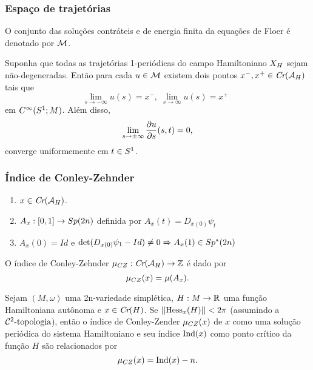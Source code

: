 \documentclass{beamer}
\begin{document}
\begin{footnotesize}
	\begin{frame}
		\frametitle{Espaço de trajetórias}
		O conjunto das soluções contráteis e de energia finita da equações de Floer é denotado por $\mathcal{M}$.
		
		\begin{teorema}\label{teorema_limite_solucoes_energia_finita}
			Suponha que todas as trajetórias 1-periódicas do campo Hamiltoniano $X_{H}$ sejam não-degeneradas. Então para cada $u \in \mathcal{M}$ existem dois pontos $x^{-}, x^{+}\in \textit{Cr}(\mathcal{A}_{H})$ tais que
			$$
			\lim_{s\to -\infty}u(s)=x^{-},\; \lim_{s\to \infty}u(s)=x^{+}\;\;
			$$
			em $C^{\infty}(S^{1};M)$. Além disso, 
			$$
			\lim_{s\to \pm \infty}\frac{\partial u}{\partial s}(s,t) = 0,
			$$
			converge uniformemente em $t\in S^{1}$.
		\end{teorema}
		
	\end{frame}

	
	\begin{frame}
		
		\frametitle{Índice de Conley-Zehnder}
		\begin{enumerate}
			\item $x\in \textit{Cr}(\mathcal{A}_{H})$.
			
			\item $A_{x}:[0,1] \to Sp(2n)$ definida por $A_{x}(t) = D_{x(0)}\psi_{t}$
			
			\item $A_{x}(0) =Id$ e $\det(D_{x(0)}\psi_{1}-Id) \neq 0 \Rightarrow A_{x}(1)\in Sp^{*}(2n)$ 
		\end{enumerate}
		
		O índice de Conley-Zehnder $\mu_{CZ}:\textit{Cr}(\mathcal{A}_{H}) \to \mathbb{Z}$ é dado por 
		$$
		\mu_{CZ}(x) = \mu(A_{x}).
		$$
		
		
		\begin{corolario}
			Sejam $(M,\omega)$ uma 2n-variedade simplética, $H:M\to \mathbb{R}^{}$ uma função Hamiltoniana autônoma e $x \in \textit{Cr}(H)$. Se $||\text{Hess}_{x}(H)||<2\pi$ (assumindo a $\mathcal{C}^{2}\text{-topologia}$), então o índice de Conley-Zender $\mu_{CZ}(x)$ de $x$ como uma solução periódica do sistema Hamiltoniano e seu índice $\text{Ind}(x)$ como ponto crítico da função $H$ são relacionados por
			$$
			\mu_{CZ}(x) = \text{Ind}(x)-n.
			$$
		\end{corolario}
	\end{frame}
	

\end{footnotesize}
\end{document}

